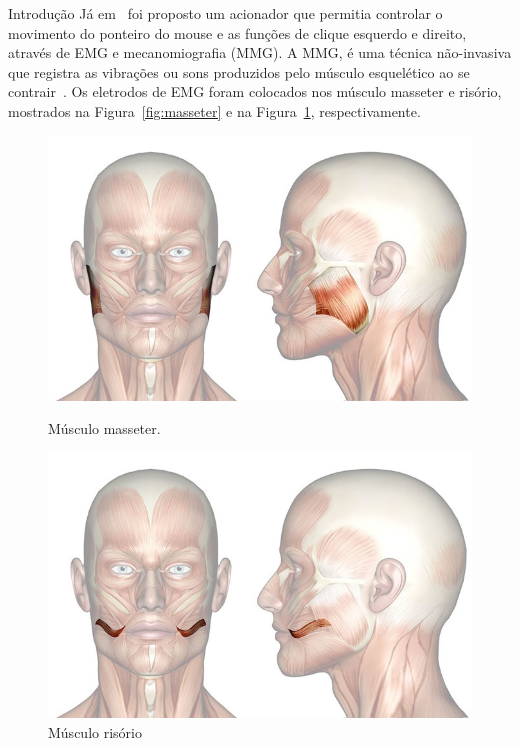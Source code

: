 \begin{chapter}{Introdução}
Já em~\cite{Kaushik12} foi proposto um acionador que permitia controlar o
movimento do ponteiro do mouse e as funções de clique esquerdo e
direito, através de EMG e mecanomiografia (MMG). A MMG, é uma técnica
não-invasiva que registra as vibrações ou sons produzidos pelo músculo
esquelético ao se contrair~\cite{Vaz99}. Os eletrodos de EMG foram colocados nos
músculo masseter e risório, mostrados na Figura~\ref{fig:masseter} e na
Figura~\ref{fig:risorio}, respectivamente. %
\begin{figure}[h!]
    \centering
    \begin{minipage}{.5\textwidth}
        \centering
        \includegraphics[width=0.91\linewidth, height=0.2\textheight]{fig/masseter}
        \caption{Músculo masseter.}
        \label{fig:masseter}
    \end{minipage}%
    \begin{minipage}{0.5\textwidth}
        \centering
        \includegraphics[width=0.91\linewidth, height=0.2\textheight]{fig/risorio}
        \caption{Músculo risório}
        \label{fig:risorio}
    \end{minipage}

\end{figure}
\end{chapter}
